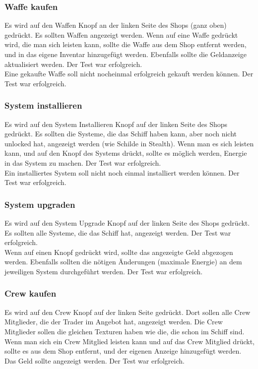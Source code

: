 \documentclass[fontsize=12pt,paper=a4,twoside]{scrartcl}
\begin{document}
\subsubsection{Waffe kaufen}
Es wird auf den Waffen Knopf an der linken Seite des Shops (ganz oben) gedrückt. Es sollten Waffen angezeigt werden. Wenn auf eine Waffe gedrückt wird, die man sich leisten kann, sollte die Waffe aus dem Shop entfernt werden, und in das eigene Inventar hinzugefügt werden. Ebenfalls sollte die Geldanzeige aktualisiert werden.  Der Test war erfolgreich. \\
Eine gekaufte Waffe soll nicht nocheinmal erfolgreich gekauft werden können. Der Test war erfolgreich. \\
\subsubsection{System installieren}
Es wird auf den System Installieren Knopf auf der linken Seite des Shops gedrückt. Es sollten die Systeme, die das Schiff haben kann, aber noch nicht unlocked hat, angezeigt werden (wie Schilde in Stealth). Wenn man es sich leisten kann, und auf den Knopf des Systems drückt, sollte es möglich werden, Energie in das System zu machen.  Der Test war erfolgreich. \\ 
Ein installiertes System soll nicht noch einmal installiert werden können.  Der Test war erfolgreich. \\
\subsubsection{System upgraden}
Es wird auf den System Upgrade Knopf auf der linken Seite des Shops gedrückt. Es sollten alle Systeme, die das Schiff hat, angezeigt werden.  Der Test war erfolgreich. \\
Wenn auf einen Knopf gedrückt wird, sollte das angezeigte Geld abgezogen werden. Ebenfalls sollten die nötigen Änderungen (maximale Energie) an dem jeweiligen System durchgeführt werden. Der Test war erfolgreich. \\
\subsubsection{Crew kaufen}
Es wird auf den Crew Knopf auf der linken Seite gedrückt. Dort sollen alle Crew Mitglieder, die der Trader im Angebot hat, angezeigt werden. Die Crew Mitglieder sollen die gleichen Texturen haben wie die, die schon im Schiff sind. Wenn man sich ein Crew Mitglied leisten kann und auf das Crew Mitglied drückt, sollte es aus dem Shop entfernt, und der eigenen Anzeige hinzugefügt werden. Das Geld sollte angezeigt werden.  Der Test war erfolgreich. \\
\end{document}
